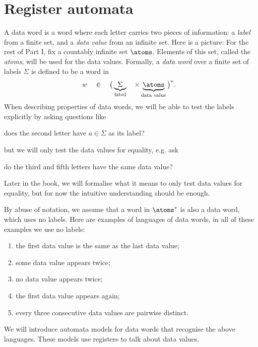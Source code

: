 \chapter{Register automata}
\label{sec:register-automata}

A data word is a word where each letter carries two pieces of information: a \emph{label} from a finite set, and a \emph{data value} from an infinite set. Here is a picture:
For the rest of Part I, fix a countably infinite set $\atoms$. Elements of this set, called the \emph{atoms}, will be used for the data values. 
Formally, a \emph{data word} over a finite set of labels $\Sigma$ is defined to be a word in
\begin{align*}
	w \quad \in \quad \big(\underbrace{\Sigma}_{\text{label}} \quad \times \underbrace{\atoms}_{\text{data value}}\big)^*.
\end{align*}
When describing properties of data words, we will be able to test the labels explicitly by asking questions like 
\begin{center}
	does the second letter have $a \in \Sigma$ as its label?
\end{center}
but we will only test the data values for equality, e.g. ask 
\begin{center}
	do the third and fifth letters have the same data value?
\end{center}
Later in the book, we will formalise what it means to only test data values for equality, but for now the intuitive understanding should be enough. 

\begin{myexample}\label{ex:data-languages}
By abuse of notation, we assume that a word in $\atoms^*$ is also a data word, which uses no labels. Here are examples of languages of data words, in all of these examples we use no labels:
\begin{enumerate}
	\item the first data value is the same as the last data value;
\item some data value appears twice;
\item no data value appears twice;
\item the first data value appears again;
\item every three consecutive data values are pairwise distinct.
\end{enumerate}	
\end{myexample} 

We will introduce automata models for data words that recognise the above languages. These models use registers to talk about data values.



